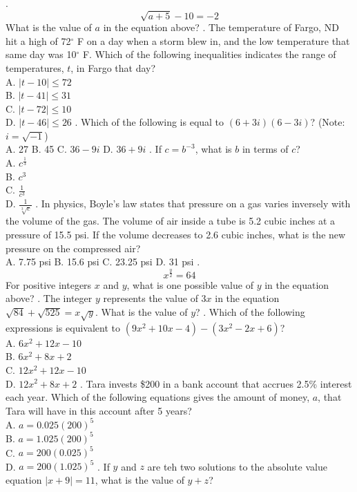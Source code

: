 \documentclass[../satmath.tex]{subfiles}
\begin{document}
. 
\[\sqrt{a+5}-10=-2\]
What is the value of $a$ in the equation above?
. The temperature of Fargo, ND hit a high of 72$^{\circ}$ F on a day when a storm blew in, and the low temperature that same day was 
10$^{\circ}$ F. Which of the following inequalities indicates the range of temperatures, $t$, in Fargo that day?\\
A. $|t-10|\leq 72$\\
B. $|t-41|\leq 31$\\
C. $|t-72|\leq 10$\\
D. $|t-46|\leq 26$
. Which of the following is equal to $(6+3i)(6-3i)$? (Note: $i=\sqrt{-1}$)\\
A. 27 \quad B. 45 \quad C. $36-9i$ \quad D. $36+9i$
. If $c=b^{-3}$, what is $b$ in terms of $c$?\\
A. $c^{\frac{1}{3}}$\\
B. $c^3$\\
C. $\frac{1}{c^3}$\\
D. $\frac{1}{\sqrt[3]{c}}$
. In physics, Boyle's law states that pressure on a gas varies inversely with the volume of the gas. The volume of air inside a tube is 
5.2 cubic inches at a pressure of 15.5 psi. If the volume decreases to 2.6 cubic inches, what is the new pressure on the compressed air?\\
A. 7.75 psi \quad B. 15.6 psi \quad C. 23.25 psi \quad D. 31 psi 
. 
\[x^{\frac{y}{2}}=64\]
For positive integers $x$ and $y$, what is one possible value of $y$ in the equation above?
. The integer $y$ represents the value of $3x$ in the equation $\sqrt{84}+\sqrt{525}=x\sqrt{y}$. What is the value of $y$?
. Which of the following expressions is equivalent to $(9x^2+10x-4)-(3x^2-2x+6)$?\\
A. $6x^2+12x-10$\\
B. $6x^2+8x+2$\\
C. $12x^2+12x-10$\\
D. $12x^2+8x+2$
. Tara invests \$200 in a bank account that accrues 2.5\% interest each year. Which of the following equations gives the amount of money, $a$, that
Tara will have in this account after 5 years?\\
A. $a=0.025(200)^5$\\
B. $a=1.025(200)^5$\\
C. $a=200(0.025)^5$\\
D. $a=200(1.025)^5$
. If $y$ and $z$ are teh two solutions to the absolute value equation $|x+9|=11$, what is the value of $y+z$?
\end{document}
